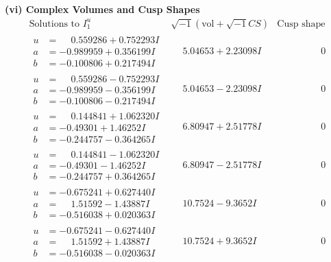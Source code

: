 \documentclass[1p]{elsarticle_modified}
\theoremstyle{definition}
\newcommand{\I}{\sqrt{-1}}
\begin{document}
\newpage\flushleft \textbf{(vi) Complex Volumes and Cusp Shapes}
$$\begin{array}{c|c|c}  
\text{Solutions to }I^u_{1}& \I (\text{vol} + \sqrt{-1}CS) & \text{Cusp shape}\\
 \hline 
\begin{aligned}
u &= \phantom{-}0.559286 + 0.752293 I \\
a &= -0.989959 + 0.356199 I \\
b &= -0.100806 + 0.217494 I\end{aligned}
 & \phantom{-}5.04653 + 2.23098 I & \phantom{-0.000000 } 0 \\ \hline\begin{aligned}
u &= \phantom{-}0.559286 - 0.752293 I \\
a &= -0.989959 - 0.356199 I \\
b &= -0.100806 - 0.217494 I\end{aligned}
 & \phantom{-}5.04653 - 2.23098 I & \phantom{-0.000000 } 0 \\ \hline\begin{aligned}
u &= \phantom{-}0.144841 + 1.062320 I \\
a &= -0.49301 + 1.46252 I \\
b &= -0.244757 - 0.364265 I\end{aligned}
 & \phantom{-}6.80947 + 2.51778 I & \phantom{-0.000000 } 0 \\ \hline\begin{aligned}
u &= \phantom{-}0.144841 - 1.062320 I \\
a &= -0.49301 - 1.46252 I \\
b &= -0.244757 + 0.364265 I\end{aligned}
 & \phantom{-}6.80947 - 2.51778 I & \phantom{-0.000000 } 0 \\ \hline\begin{aligned}
u &= -0.675241 + 0.627440 I \\
a &= \phantom{-}1.51592 - 1.43887 I \\
b &= -0.516038 + 0.020363 I\end{aligned}
 & \phantom{-}10.7524 - 9.3652 I & \phantom{-0.000000 } 0 \\ \hline\begin{aligned}
u &= -0.675241 - 0.627440 I \\
a &= \phantom{-}1.51592 + 1.43887 I \\
b &= -0.516038 - 0.020363 I\end{aligned}
 & \phantom{-}10.7524 + 9.3652 I & \phantom{-0.000000 } 0 \\ \hline\begin{aligned}

\end{aligned}
\end{array}$$
\end{document}
